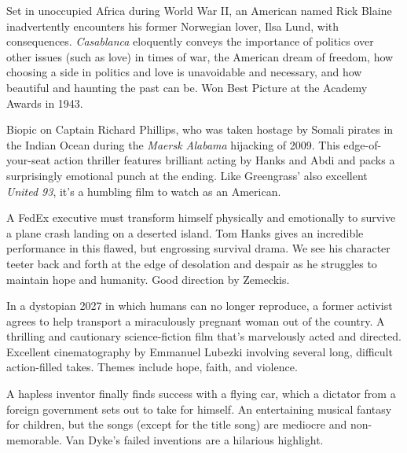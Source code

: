    Set in unoccupied Africa during World War II, an American named Rick Blaine inadvertently encounters his former Norwegian lover, Ilsa Lund, with consequences. \textit{Casablanca} eloquently conveys the importance of politics over other issues (such as love) in times of war, the American dream of freedom, how choosing a side in politics and love is unavoidable and necessary, and how beautiful and haunting the past can be. Won Best Picture at the Academy Awards in 1943. \author{AW}

   \author{} Biopic on Captain Richard Phillips, who was taken hostage by Somali pirates in the Indian Ocean during the \textit{Maersk Alabama} hijacking of 2009. This edge-of-your-seat action thriller features brilliant acting by Hanks and Abdi and packs a surprisingly emotional punch at the ending. Like Greengrass' also excellent \textit{United 93}, it's a humbling film to watch as an American. \author{DW} 

   A FedEx executive must transform himself physically and emotionally to survive a plane crash landing on a deserted island. Tom Hanks gives an incredible performance in this flawed, but engrossing survival drama. We see his character teeter back and forth at the edge of desolation and despair as he struggles to maintain hope and humanity. Good direction by Zemeckis. \author{DW} 

   In a dystopian 2027 in which humans can no longer reproduce, a former activist agrees to help transport a miraculously pregnant woman out of the country. A thrilling and cautionary science-fiction film that's marvelously acted and directed. Excellent cinematography by Emmanuel Lubezki involving several long, difficult action-filled takes. Themes include hope, faith, and violence.  \author{DW}  

   A hapless inventor finally finds success with a flying car, which a dictator from a foreign government sets out to take for himself. An entertaining musical fantasy for children, but the songs (except for the title song) are mediocre and non-memorable. Van Dyke's failed inventions are a hilarious highlight. \author{DW} 

